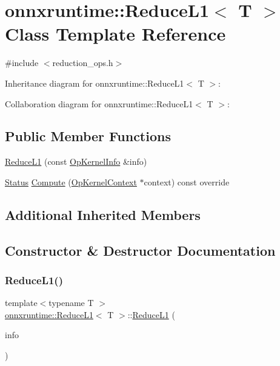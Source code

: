 \hypertarget{classonnxruntime_1_1ReduceL1}{}\section{onnxruntime\+:\+:Reduce\+L1$<$ T $>$ Class Template Reference}
\label{classonnxruntime_1_1ReduceL1}


{\ttfamily \#include $<$reduction\+\_\+ops.\+h$>$}



Inheritance diagram for onnxruntime\+:\+:Reduce\+L1$<$ T $>$\+:


Collaboration diagram for onnxruntime\+:\+:Reduce\+L1$<$ T $>$\+:
\subsection*{Public Member Functions}
\begin{DoxyCompactItemize}
\item 
\mbox{\hyperlink{classonnxruntime_1_1ReduceL1_aefeb5da06d341cfd284912615a365dfd}{Reduce\+L1}} (const \mbox{\hyperlink{classonnxruntime_1_1OpKernelInfo}{Op\+Kernel\+Info}} \&info)
\item 
\mbox{\hyperlink{classonnxruntime_1_1common_1_1Status}{Status}} \mbox{\hyperlink{classonnxruntime_1_1ReduceL1_a557360e347a1a330d5daeeb84b0e8a6e}{Compute}} (\mbox{\hyperlink{classonnxruntime_1_1OpKernelContext}{Op\+Kernel\+Context}} $\ast$context) const override
\end{DoxyCompactItemize}
\subsection*{Additional Inherited Members}


\subsection{Constructor \& Destructor Documentation}
\mbox{\label{classonnxruntime_1_1ReduceL1_aefeb5da06d341cfd284912615a365dfd}} 
\subsubsection{\texorpdfstring{Reduce\+L1()}{ReduceL1()}}
{\footnotesize\ttfamily template$<$typename T $>$ \\
\mbox{\hyperlink{classonnxruntime_1_1ReduceL1}{onnxruntime\+::\+Reduce\+L1}}$<$ T $>$\+::\mbox{\hyperlink{classonnxruntime_1_1ReduceL1}{Reduce\+L1}} (\begin{DoxyParamCaption}\item[{const \mbox{\hyperlink{classonnxruntime_1_1OpKernelInfo}{Op\+Kernel\+Info}} \&}]{info }\end{DoxyParamCaption})\hspace{0.3cm}{\ttfamily [inline]}}



